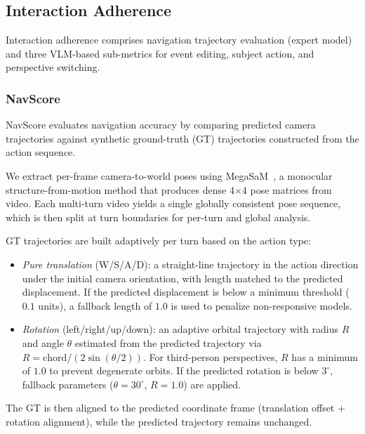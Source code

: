 \subsection{Interaction Adherence}
\label{app:interaction_detail}

Interaction adherence comprises navigation trajectory evaluation (expert model) and three VLM-based sub-metrics for event editing, subject action, and perspective switching.

\subsubsection{NavScore}
\label{app:nav_detail}

NavScore evaluates navigation accuracy by comparing predicted camera trajectories against synthetic ground-truth (GT) trajectories constructed from the action sequence.

We extract per-frame camera-to-world poses using MegaSaM~\cite{li2024megasam}, a monocular structure-from-motion method that produces dense 4$\times$4 pose matrices from video.
Each multi-turn video yields a single globally consistent pose sequence, which is then split at turn boundaries for per-turn and global analysis.

GT trajectories are built adaptively per turn based on the action type:
\begin{itemize}[leftmargin=1.5em, nosep]
  \item \emph{Pure translation} (W/S/A/D): a straight-line trajectory in the action direction under the initial camera orientation, with length matched to the predicted displacement. If the predicted displacement is below a minimum threshold ($0.1$ units), a fallback length of $1.0$ is used to penalize non-responsive models.
  \item \emph{Rotation} (left/right/up/down): an adaptive orbital trajectory with radius $R$ and angle $\theta$ estimated from the predicted trajectory via $R = \text{chord} / (2\sin(\theta/2))$. For third-person perspectives, $R$ has a minimum of $1.0$ to prevent degenerate orbits. If the predicted rotation is below $3^\circ$, fallback parameters ($\theta = 30^\circ$, $R = 1.0$) are applied.
\end{itemize}
The GT is then aligned to the predicted coordinate frame (translation offset + rotation alignment), while the predicted trajectory remains unchanged.

